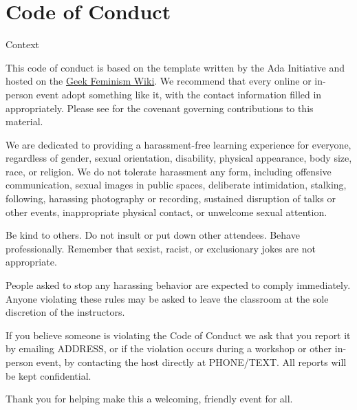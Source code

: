 \chapter{Code of Conduct}\label{s:conduct}

\begin{callout}{Context}

  This code of conduct is based on the template written by the Ada
  Initiative and hosted on the
  \href{http://geekfeminism.wikia.com/wiki/Conference\_anti-harassment/Policy}{Geek
    Feminism Wiki}.  We recommend that every online or in-person event
  adopt something like it, with the contact information filled in
  appropriately.  Please see  for the
  covenant governing contributions to this material.

\end{callout}

We are dedicated to providing a harassment-free learning experience
for everyone, regardless of gender, sexual orientation, disability,
physical appearance, body size, race, or religion.  We do not tolerate
harassment any form, including offensive communication, sexual images
in public spaces, deliberate intimidation, stalking, following,
harassing photography or recording, sustained disruption of talks or
other events, inappropriate physical contact, or unwelcome sexual
attention.

Be kind to others. Do not insult or put down other attendees. Behave
professionally. Remember that sexist, racist, or exclusionary jokes
are not appropriate.

People asked to stop any harassing behavior are expected to comply
immediately.  Anyone violating these rules may be asked to leave the
classroom at the sole discretion of the instructors.

If you believe someone is violating the Code of Conduct we ask that
you report it by emailing ADDRESS, or if the violation occurs during a
workshop or other in-person event, by contacting the host
directly at PHONE/TEXT. All reports will be kept confidential.

Thank you for helping make this a welcoming, friendly event for all.
